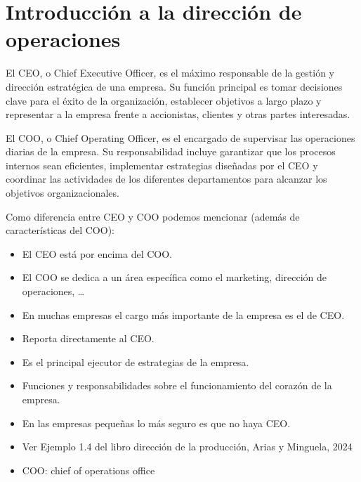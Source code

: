\documentclass[12pt]{book} %
\providecommand{\tightlist}{%
  \setlength{\itemsep}{0pt}\setlength{\parskip}{0pt}}
\begin{document}
\hypertarget{introducciuxf3n-a-la-direcciuxf3n-de-operaciones}{%
\chapter{Introducción a la dirección de
operaciones}\label{introducciuxf3n-a-la-direcciuxf3n-de-operaciones}}

\begin{definicion}
El CEO, o Chief Executive Officer, es el máximo responsable de la gestión y dirección estratégica de una empresa. Su función principal es tomar decisiones clave para el éxito de la organización, establecer objetivos a largo plazo y representar a la empresa frente a accionistas, clientes y otras partes interesadas.
\end{definicion}

\begin{definicion}
El COO, o Chief Operating Officer, es el encargado de supervisar las operaciones diarias de la empresa. Su responsabilidad incluye garantizar que los procesos internos sean eficientes, implementar estrategias diseñadas por el CEO y coordinar las actividades de los diferentes departamentos para alcanzar los objetivos organizacionales.
\end{definicion}

Como diferencia entre CEO y COO podemos mencionar (además de
características del COO):

\begin{itemize}
\tightlist
\item
  El CEO está por encima del COO.\\
\item
  El COO se dedica a un área específica como el marketing, dirección de
  operaciones, \ldots{}\\
\item
  En muchas empresas el cargo más importante de la empresa es el de
  CEO.\\
\item
  Reporta directamente al CEO.\\
\item
  Es el principal ejecutor de estrategias de la empresa.\\
\item
  Funciones y responsabilidades sobre el funcionamiento del corazón de
  la empresa.\\
\item
  En las empresas pequeñas lo más seguro es que no haya CEO.\\
\item
  Ver Ejemplo 1.4 del libro dirección de la producción, Arias y
  Minguela, 2024\\
\item
  COO: chief of operations office
\end{itemize}
\end{document}

